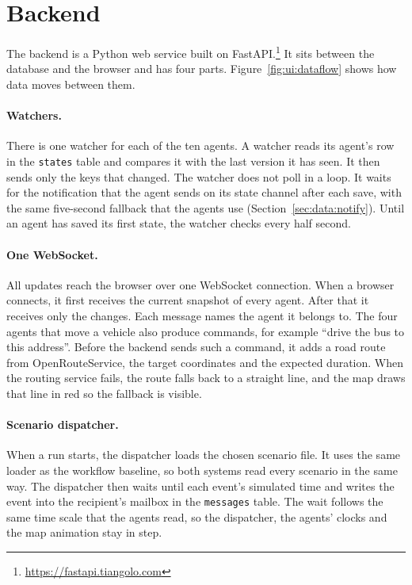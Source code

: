 \section{Backend}
\label{sec:ui:backend}

The backend is a Python web service built on
FastAPI.\footnote{\url{https://fastapi.tiangolo.com}} It sits between the
database and the browser and has four parts. Figure~\ref{fig:ui:dataflow}
shows how data moves between them.



\paragraph{Watchers.} There is one watcher for each of the ten agents. A
watcher reads its agent's row in the \texttt{states} table and compares it
with the last version it has seen. It then sends only the keys that changed.
The watcher does not poll in a loop. It waits for the notification that the
agent sends on its state channel after each save, with the same five-second
fallback that the agents use (Section~\ref{sec:data:notify}). Until an agent
has saved its first state, the watcher checks every half second.

\paragraph{One WebSocket.} All updates reach the browser over one WebSocket
connection. When a browser connects, it first receives the current snapshot of
every agent. After that it receives only the changes. Each message names the
agent it belongs to. The four agents that move a vehicle also produce
commands, for example ``drive the bus to this address''. Before the backend
sends such a command, it adds a road route from OpenRouteService, the target
coordinates and the expected duration. When the routing service fails, the
route falls back to a straight line, and the map draws that line in red so
the fallback is visible.

\paragraph{Scenario dispatcher.} When a run starts, the dispatcher loads the
chosen scenario file. It uses the same loader as the workflow baseline, so both
systems read every scenario in the same way. The
dispatcher then waits until each event's simulated time and writes the event
into the recipient's mailbox in the \texttt{messages} table. The wait follows
the same time scale that the agents read, so the dispatcher, the agents' clocks
and the map animation stay in step.

